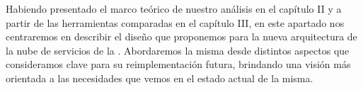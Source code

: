 Habiendo presentado el marco teórico de nuestro análisis en el capítulo II y a partir de las herramientas comparadas en el capítulo III, en este apartado nos centraremos en describir el diseño que proponemos para la nueva arquitectura de la nube de servicios de la {\unlp}. Abordaremos la misma desde distintos aspectos que consideramos clave para su reimplementación futura, brindando una visión más orientada a las necesidades que vemos en el estado actual de la misma.
